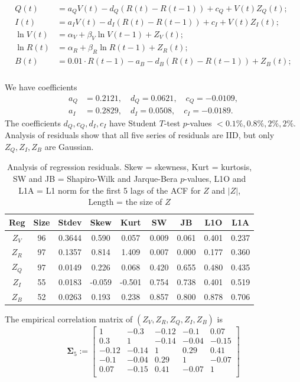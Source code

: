 \documentclass[12pt]{amsart}
\begin{document}
\begin{align}
\label{eq:duration-system}
\begin{split}
Q(t) &= a_QV(t) - d_Q(R(t) - R(t-1)) + c_Q + V(t)Z_Q(t);\\
I(t) &= a_IV(t) - d_I(R(t) - R(t-1)) + c_I + V(t)Z_I(t);\\
\ln V(t) &= \alpha_V  + \beta_V\ln V(t-1) + Z_V(t);\\
\ln R(t) &= \alpha_R + \beta_R\ln R(t-1) + Z_R(t);\\
B(t) &= 0.01\cdot R(t-1) -a_B - d_B(R(t) - R(t-1)) + Z_B(t);\\
\end{split}
\end{align}

We have coefficients
\begin{align*}
a_Q &= 0.2121,\quad d_Q = 0.0621,\quad c_Q = -0.0109,\\
a_I &= 0.2829,\quad d_I = 0.0508,\quad c_I = -0.0189.
\end{align*}
The coefficients $d_Q, c_Q, d_I, c_I$ have Student $T$-test $p$-values $<0.1\%, 0.8\%, 2\%, 2\%$. Analysis of residuals show that all five series of residuals are IID, but only $Z_Q, Z_I, Z_B$ are Gaussian. 

\begin{table}
\centering
\begin{tabular}{|ccccccccc|}
\hline
Reg & Size & Stdev & Skew & Kurt & SW & JB & L1O & L1A \\
\hline
$Z_V$ & 96 & 0.3644 & 0.590 & 0.057 & 0.009 & 0.061 & 0.401 & 0.237 \\
$Z_R$ & 97 & 0.1357 & 0.814 & 1.409 & 0.007 & 0.000 & 0.177 & 0.360  \\
$Z_Q$ & 97 & 0.0149 & 0.226 & 0.068 & 0.420 & 0.655 & 0.480 & 0.435 \\
$Z_I$ & 55 & 0.0183 & -0.059 & -0.501 & 0.754 & 0.738 & 0.401 & 0.519 \\
$Z_B$ & 52 & 0.0263 & 0.193 & 0.238 & 0.857 & 0.800 & 0.878 & 0.706 \\
\hline
\end{tabular}
\caption{Analysis of regression residuals. Skew = skewness, Kurt = kurtosis, SW and JB =  Shapiro-Wilk and Jarque-Bera $p$-values, L1O and L1A = L1 norm for the first 5 lags of the ACF for $Z$ and $|Z|$, Length = the size of $Z$}
\label{table:residuals-simple}
\end{table}

The empirical correlation matrix of $(Z_V, Z_R, Z_Q, Z_I, Z_B)$ is 
$$
\mathbf{\Sigma}_5 := 
\begin{bmatrix}
1 & -0.3 & -0.12 & -0.1 & 0.07\\
0.3 & 1 & -0.14 & -0.04 & -0.15\\
-0.12 & -0.14 & 1 & 0.29 & 0.41\\
-0.1 & -0.04 & 0.29 & 1 & -0.07\\
0.07 & -0.15 & 0.41 & -0.07 & 1\\
\end{bmatrix}
$$
\end{document}
